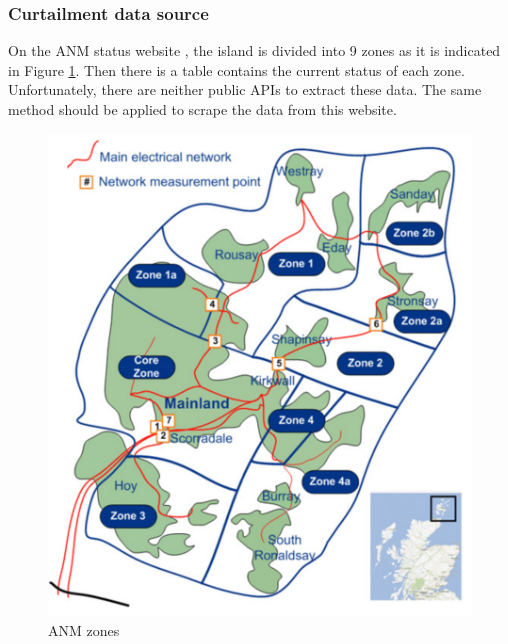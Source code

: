 \documentclass[12pt,a4paper]{report}
\begin{document}
            \subsubsection{Curtailment data source}
                On the ANM status website \cite{website:ANMstatus}, the island is divided into 9 zones as it is indicated in Figure \ref{fig_map}. Then there is a 
                table contains the current status of each zone. Unfortunately, there are neither public APIs to extract these data. The same method should
                be applied to scrape the data from this website.

                \begin{figure}[ht]
                    \centerline{\includegraphics[scale=1]{map}}
                    \caption{ANM zones}
                    \label{fig_map}
                \end{figure}
            
\end{document}
